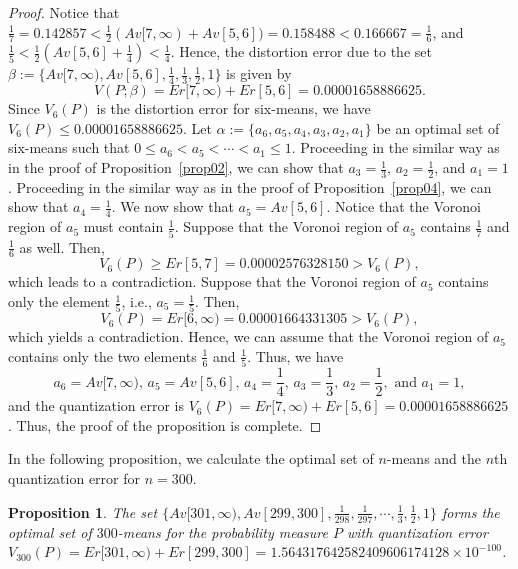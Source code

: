 \documentclass[12pt, reqno]{amsart}
\theoremstyle{plain}
\newtheorem{prop}[subsection]{Proposition}
\theoremstyle{definition}
\newcommand{\set}[1]{\{#1\}}%
\newcommand{\ga}{\alpha}
\newcommand{\gb}{\beta}
\newcommand{\te}{\text}%
\begin{document}
\begin{proof}
Notice that $\frac 1 7=0.142857<\frac 12(Av[7, \infty)+ Av[5, 6])=0.158488<0.166667=\frac 16$, and $\frac{1}{5}<\frac{1}{2} (Av[5, 6]+\frac{1}{4})<\frac{1}{4}$. Hence, the distortion error due to the set $\gb:=\set{Av[7, \infty), Av[5,6], \frac 14, \frac 13, \frac 12, 1}$ is given by
\[V(P; \gb)=Er[7, \infty)+Er[5, 6]=0.00001658886625.\]
Since $V_6(P)$ is the distortion error for six-means, we have $V_6(P)\leq 0.00001658886625$. Let $\ga:=\set{a_6, a_5, a_4, a_3, a_2, a_1}$ be an optimal set of six-means such that $0\leq a_6<a_5<\cdots<a_1\leq 1$. Proceeding in the similar way as in the proof of Proposition~\ref{prop02}, we can show that $a_3=\frac 13, \, a_2=\frac 12$, and $a_1=1$. Proceeding in the similar way as in the proof of Proposition~\ref{prop04}, we can show that $a_4=\frac 1 4$. We now show that $a_5=Av[5, 6]$. Notice that the Voronoi region of $a_5$ must contain $\frac 1 5$.
Suppose that the Voronoi region of $a_5$ contains $\frac 17$ and $\frac 16$ as well. Then,
\[V_6(P)\geq Er[5, 7]=0.00002576328150>V_6(P),\]
which leads to a contradiction. Suppose that the Voronoi region of $a_5$ contains only the element $\frac 15$, i.e., $a_5=\frac 15$. Then,
\[V_6(P)=Er[6, \infty)=0.00001664331305>V_6(P),\]
which yields a contradiction. Hence, we can assume that the Voronoi region of $a_5$ contains only the two elements $\frac 16$ and $\frac 15$. Thus, we have
\[a_6=Av[7, \infty), \, a_5=Av[5, 6], \, a_4=\frac 14, \, a_3=\frac 13, \, a_2=\frac 12, \te{ and } a_1=1,\]
and the quantization error is $V_6(P)=Er[7, \infty)+Er[5, 6]=0.00001658886625$. Thus, the proof of the proposition is complete.
\end{proof}
 


In the following proposition, we calculate the optimal set of $n$-means and the $n$th quantization error for $n=300$.
\begin{prop} \label{prop06}
The set $\set{Av[301, \infty), Av[299, 300], \frac 1 {298}, \frac 1{297},  \cdots, \frac 13, \frac 12, 1}$ forms the optimal set of $300$-means for the probability measure $P$ with quantization error $V_{300}(P)=Er[301, \infty)+Er[299, 300]=1.564317642582409606174128\times 10^{-100}$.
\end{prop}
 
\end{document}
